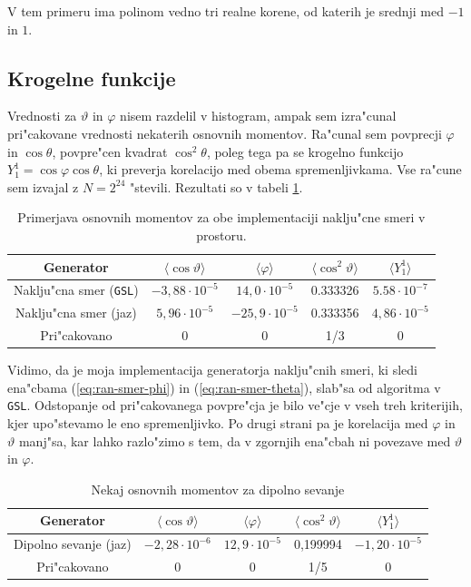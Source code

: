 \documentclass[a4paper,10pt]{article}
\begin{document}
V tem primeru ima polinom vedno tri realne korene, od katerih je srednji med $-1$ in $1$. 

\subsection{Krogelne funkcije}

Vrednosti za $\vartheta$ in $\varphi$ nisem razdelil v histogram, ampak sem izra"cunal pri"cakovane vrednosti nekaterih osnovnih momentov. Ra"cunal sem povprecji $\varphi$ in $\cos\theta$, povpre"cen kvadrat $\cos^2\theta$, poleg tega pa se krogelno funkcijo $Y_1^1 = \cos\varphi \cos\theta$, ki preverja korelacijo med obema spremenljivkama. Vse ra"cune sem izvajal z $N=2^{24}$ "stevili. Rezultati so v tabeli \ref{tab:smer}. 

\begin{table}[h]
\centering
\begin{tabular}{|c|c|c|c|c|}
 \hline
  Generator & $\langle \cos\vartheta \rangle$ & $\langle \varphi \rangle$ & $\langle \cos^2\vartheta \rangle$ & $\langle Y_1^1 \rangle$ \\
\hline
  Naklju"cna smer (\texttt{GSL}) & $-3,88 \cdot 10^{-5}$ & $14,0 \cdot 10^{-5}$ & 0.333326 & $5.58 \cdot 10^{-7}$ \\
  Naklju"cna smer (jaz) & $5,96 \cdot 10^{-5}$ & $-25,9 \cdot 10^{-5}$ & 0.333356 & $4,86 \cdot 10^{-5}$\\
\hline
  Pri"cakovano & 0 & 0 & 1/3 & 0 \\
\hline
\end{tabular}
\caption{Primerjava osnovnih momentov za obe implementaciji naklju"cne smeri v prostoru. }
\label{tab:smer}
\end{table}

Vidimo, da je moja implementacija generatorja naklju"cnih smeri, ki sledi ena"cbama (\ref{eq:ran-smer-phi}) in (\ref{eq:ran-smer-theta}), slab"sa od algoritma v \texttt{GSL}. Odstopanje od pri"cakovanega povpre"cja je bilo ve"cje v vseh treh kriterijih, kjer upo"stevamo le eno spremenljivko. Po drugi strani pa je korelacija med $\varphi$ in $\vartheta$ manj"sa, kar lahko razlo"zimo s tem, da v zgornjih ena"cbah ni povezave med $\vartheta$ in $\varphi$. 

\begin{table}[h]
\centering
\begin{tabular}{|c|c|c|c|c|}
 \hline
  Generator & $\langle \cos\vartheta \rangle$ & $\langle \varphi \rangle$ & $\langle \cos^2\vartheta \rangle$ & $\langle Y_1^1 \rangle$ \\
\hline
  Dipolno sevanje (jaz) & $-2,28\cdot 10^{-6}$ & $12,9 \cdot 10^{-5}$ & 0,199994 & $-1,20 \cdot 10^{-5}$ \\
\hline
  Pri"cakovano & 0 & 0 & 1/5 & 0\\
\hline
\end{tabular}
\caption{Nekaj osnovnih momentov za dipolno sevanje}
 \label{tab:dipol}
\end{table}
\end{document}
